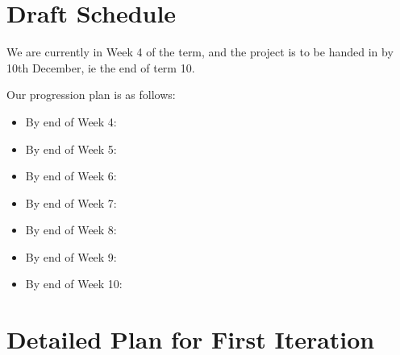 \documentclass[a4paper,11pt]{article}
\begin{document}
	
	\section{Draft Schedule}
	
		We are currently in Week 4 of the term, and the project is to be handed in by 10th December, ie the end of term 10.
		
		Our progression plan is as follows:
		
		\begin{itemize}
			\item By end of Week 4: 
			\item By end of Week 5: 
			\item By end of Week 6: 
			\item By end of Week 7: 
			\item By end of Week 8: 
			\item By end of Week 9: 
			\item By end of Week 10:
		\end{itemize}
	
	\section{Detailed Plan for First Iteration}
	
		
\end{document}

